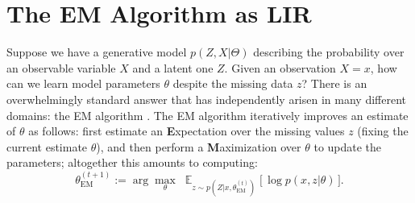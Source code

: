 \documentclass{article} %
\theoremstyle{plain}
\theoremstyle{definition}
\theoremstyle{remark}
\DeclareMathOperator*{\Ex}{\mathbb{E}} %
\begin{document}
\section{The EM Algorithm as LIR}
Suppose we have a generative model $p(Z,X | \Theta)$
describing the probability over an observable variable $X$ and a latent one $Z$.
%
Given an observation $X{=}x$,
how can we learn model parameters $\theta$ despite the missing data $z$?
There is an overwhelmingly standard answer that has independently arisen in many different domains:
the EM algorithm \citep{dempster1977maximum,mclachlan2008algorithm}.
The EM algorithm iteratively improves an estimate of $\theta$ as follows: first estimate an 
\textbf Expectation over the missing values $z$ (fixing the current estimate $\theta$), and then perform a 
\textbf Maximization over $\theta$ to update the parameters;
altogether this amounts to computing:
\[
   \theta^{(t+1)}_{\text{EM}}
           := \arg\max_{\theta}\; \Ex\nolimits_{z\sim p(Z|x,\theta_{\text{EM}}^{(t)})} \big[ \,\log p(x, z | \theta) \,\big].
\]

\end{document}

